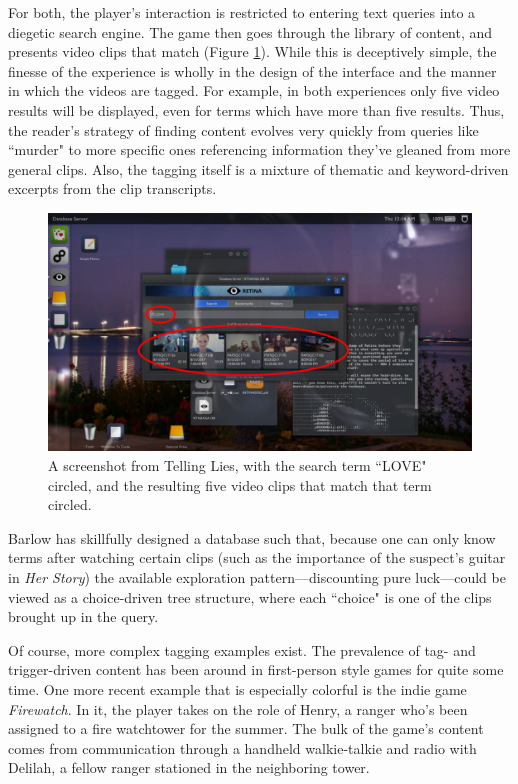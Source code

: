 For both, the player's interaction is restricted to entering text queries into a diegetic search engine. The game then goes through the library of content, and presents video clips that match (Figure \ref{fig:barlow}). While this is deceptively simple, the finesse of the experience is wholly in the design of the interface and the manner in which the videos are tagged. For example, in both experiences only five video results will be displayed, even for terms which have more than five results. Thus, the reader's strategy of finding content evolves very quickly from queries like ``murder" to more specific ones referencing information they've gleaned from more general clips. Also, the tagging itself is a mixture of thematic and keyword-driven excerpts from the clip transcripts.


\begin{figure}
    \centering
    \includegraphics[width=\textwidth]{figures/2-Ice-Bound/barlow.png}
    \caption{A screenshot from Telling Lies, with the search term ``LOVE" circled, and the resulting five video clips that match that term circled.}
    \label{fig:barlow}
\end{figure}


Barlow has skillfully designed a database such that, because one can only know terms after watching certain clips (such as the importance of the suspect's guitar in \textit{Her Story}) the available exploration pattern---discounting pure luck---could be viewed as a choice-driven tree structure, where each ``choice" is one of the clips brought up in the query.

Of course, more complex tagging examples exist. The prevalence of tag- and trigger-driven content has been around in first-person style games for quite some time. One more recent example that is especially colorful is the indie game \textit{Firewatch}. In it, the player takes on the role of Henry, a ranger who's been assigned to a fire watchtower for the summer. The bulk of the game's content comes from communication through a handheld walkie-talkie and radio with Delilah, a fellow ranger stationed in the neighboring tower.

